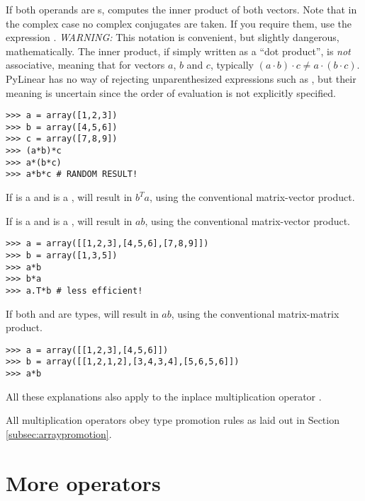 If both operands are s,  computes the inner
product of both vectors. Note that in the complex case no complex
conjugates are taken. If you require them, use the expression
. \emph{WARNING:} This notation is convenient, but
slightly dangerous, mathematically. The inner product, if simply
written as a ``dot product'', is \emph{not} associative, meaning that
for vectors $a$, $b$ and $c$, typically $(a\cdot b)\cdot
c\not=a\cdot(b\cdot c)$.  PyLinear has no way of rejecting
unparenthesized expressions such as , but their meaning is
uncertain since the order of evaluation is not explicitly specified.

\begin{verbatim}
>>> a = array([1,2,3])
>>> b = array([4,5,6])
>>> c = array([7,8,9])
>>> (a*b)*c
>>> a*(b*c)
>>> a*b*c # RANDOM RESULT!
\end{verbatim}

If  is a  and  is a ,
 will result in $b^Ta$, using the conventional matrix-vector
product.

If  is a  and  is a ,
 will result in $a b$, using the conventional matrix-vector
product.

\begin{verbatim}
>>> a = array([[1,2,3],[4,5,6],[7,8,9]])
>>> b = array([1,3,5])
>>> a*b
>>> b*a
>>> a.T*b # less efficient!
\end{verbatim}

If both  and  are  types,
 will result in $a b$, using the conventional matrix-matrix
product.
\begin{verbatim}
>>> a = array([[1,2,3],[4,5,6]])
>>> b = array([[1,2,1,2],[3,4,3,4],[5,6,5,6]])
>>> a*b
\end{verbatim}

All these explanations also apply to the inplace multiplication
operator \code{*=}.

All multiplication operators obey type promotion rules as laid out
in Section \ref{subsec:arraypromotion}.

\section{More  operators}

